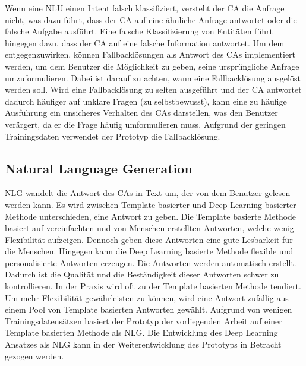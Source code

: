         Wenn eine NLU einen Intent falsch klassifiziert, versteht der CA die Anfrage nicht, was dazu führt, dass der CA auf eine ähnliche
        Anfrage antwortet oder die falsche Aufgabe ausführt.
        Eine falsche Klassifizierung von Entitäten führt hingegen dazu, dass der CA auf eine falsche Information antwortet.
        Um dem entgegenzuwirken, können Fallbacklösungen als Antwort des CAs implementiert werden, um dem Benutzer die Möglichkeit zu geben, 
        seine ursprüngliche Anfrage umzuformulieren. Dabei ist darauf zu achten, wann eine Fallbacklösung ausgelöst werden soll.
        Wird eine Fallbacklösung zu selten ausgeführt und der CA antwortet dadurch häufiger auf unklare Fragen (zu selbstbewusst),
        kann eine zu häufige Ausführung ein unsicheres Verhalten des CAs darstellen, was den Benutzer verärgert, da er die Frage häufig umformulieren muss.
        \parencite[3]{Ahmad.2021}\parencite[139]{Sieber.2019} 
        Aufgrund der geringen Trainingsdaten verwendet der Prototyp die Fallbacklösung.
        
        \subsection{Natural Language Generation}
        NLG wandelt die Antwort des CAs in Text um, der von dem Benutzer gelesen werden kann. 
        Es wird zwischen Template basierter und Deep Learning basierter Methode unterschieden, eine Antwort zu geben.
        Die Template basierte Methode basiert auf vereinfachten und von Menschen erstellten Antworten, welche wenig Flexibilität
        aufzeigen. Dennoch geben diese Antworten eine gute Lesbarkeit für die Menschen. Hingegen kann die Deep Learning basierte Methode flexible
        und personalisierte Antworten erzeugen. Die Antworten werden
        automatisch erstellt. Dadurch ist die Qualität und die Beständigkeit dieser Antworten schwer zu kontrollieren.
        In der Praxis wird oft zu der Template basierten Methode tendiert. 
        Um mehr Flexibilität gewährleisten zu können, wird eine Antwort zufällig aus einem Pool von Template basierten Antworten gewählt. \parencite[24]{Kong.2021}
        Aufgrund von wenigen Trainingsdatensätzen basiert der Prototyp der vorliegenden Arbeit auf einer Template basierten Methode als NLG.
        Die Entwicklung des Deep Learning Ansatzes als NLG kann in der Weiterentwicklung des Prototyps in Betracht gezogen werden. 
       
